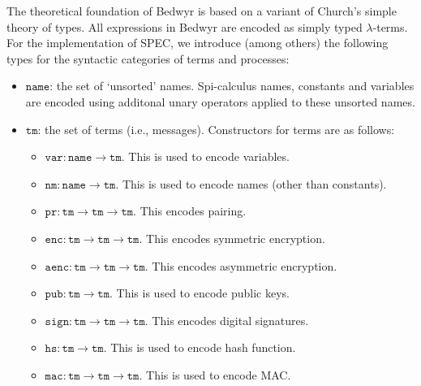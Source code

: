 \documentclass{article}
\newcommand\obj[1]{\texttt{#1}}
\begin{document}
The theoretical foundation of Bedwyr is based on a variant of Church's simple theory of
types. All expressions in Bedwyr are encoded as simply typed $\lambda$-terms. 
For the implementation of SPEC, we introduce (among others) the following types for
the syntactic categories of terms and processes:
\begin{itemize}
\item $\obj{name}$: the set of `unsorted' names. Spi-calculus names, constants and variables
are encoded using additonal unary operators applied to these unsorted names.

\item $\obj{tm}$: the set of terms (i.e., messages). Constructors for terms are as follows:
\begin{itemize}
\item $\obj{var} : \obj{name} \to \obj{tm}$. This is used to encode variables. 
\item $\obj{nm} : \obj{name} \to \obj{tm}$. This is used to encode names (other than constants). 
\item $\obj{pr} : \obj{tm} \to \obj{tm} \to \obj{tm}$. This encodes pairing.
\item $\obj{enc} : \obj{tm} \to \obj{tm} \to \obj{tm}$. This encodes symmetric encryption.
\item $\obj{aenc} : \obj{tm} \to \obj{tm} \to \obj{tm}$. This encodes asymmetric encryption.
\item $\obj{pub} : \obj{tm} \to \obj{tm}$. This is used to encode public keys.
\item $\obj{sign} : \obj{tm} \to \obj{tm} \to \obj{tm}$. This encodes digital signatures.
\item $\obj{hs} : \obj{tm} \to \obj{tm}$. This is used to encode hash function.
\item $\obj{mac} : \obj{tm} \to \obj{tm} \to \obj{tm}$. This is used to encode MAC.
\end{itemize}


\end{itemize}
\end{document}
